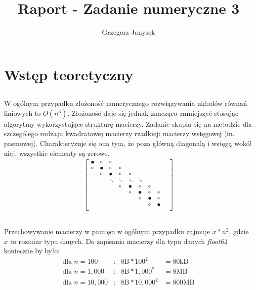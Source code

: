 \documentclass[11pt]{extarticle}
\author{Grzegorz Janysek}
\title{Raport - Zadanie numeryczne 3}
\begin{document}
	\maketitle

	\section{Wstęp teoretyczny}
	\subsection{}
	W ogólnym przypadku złożoność numerycznego rozwiązywania układów równań liniowych to \(O(n^3)\).
	Złożoność daje się jednak znacząco zmniejszyć stosując algorytmy wykorzystujące strukturę macierzy.
	Zadanie skupia się na metodzie dla szczególego rodzaju kwadratowej macierzy rzadkiej: macierzy wstęgowej (in. pasmowej). 
	Charakteryzuje się ona tym, że poza główną diagonalą i wstęgą wokół niej, wszystkie elementy są zerowe.
	\begin{align}
		\begin{bmatrix}
								\bullet	&	\circ	&	\circ	\\
					\circ	&	\bullet	&	\circ	&	\circ	\\
			&		\circ	&	\bullet	&	\circ	&	\circ	\\
			&&		\ddots	&	\ddots	&	\ddots	&	\ddots	\\
			&&&		\circ	&	\bullet	&	\circ	&	\circ	\\
			&&&&	\circ	&	\bullet	&	\circ	&	\circ	\\
			&&&&&	\circ	&	\bullet &	\circ				\\
			&&&&&&	\circ	&	\bullet	&						\\
		\end{bmatrix}
	\end{align}
	
	\subsection{}
	Przechowywanie macierzy w pamięci w ogólnym przypadku zajmuje \(x*n^2\), gdzie \(x\) to rozmiar typu danych.
	Do zapisania macierzy dla typu danych \emph{float64} konieczne by było: 
	\begin{align}
		\text{dla } n=100 &:& 8\text{B}*100^2 &= 80\text{kB} \\
		\text{dla } n=1,000 &:& 8\text{B}*1,000^2 &= 8\text{MB} \\
		\label{rozmiar_og_N10000}
		\text{dla } n=10,000 &:& 8\text{B}*10,000^2 &= 800\text{MB}
	\end{align}
\end{document}
